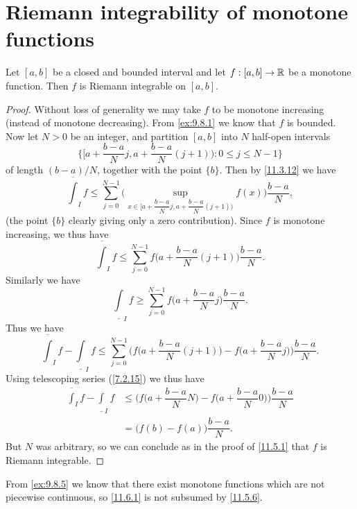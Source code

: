 \section{Riemann integrability of monotone functions}\label{sec:11.6}

\begin{prop}\label{11.6.1}
  Let \([a, b]\) be a closed and bounded interval and let \(f : [a, b] \to \mathbb{R}\) be a monotone function.
  Then \(f\) is Riemann integrable on \([a, b]\).
\end{prop}

\begin{proof}
  Without loss of generality we may take \(f\) to be monotone increasing (instead of monotone decreasing).
  From \cref{ex:9.8.1} we know that \(f\) is bounded.
  Now let \(N > 0\) be an integer, and partition \([a, b]\) into \(N\) half-open intervals
  \[
    \bigg\{\big[a + \dfrac{b - a}{N} j, a + \dfrac{b - a}{N} (j + 1)\big) : 0 \leq j \leq N - 1\bigg\}
  \]
  of length \((b - a) / N\), together with the point \(\{b\}\).
  Then by \cref{11.3.12} we have
  \[
    \overline{\int}_I f \leq \sum_{j = 0}^{N - 1} \Bigg(\sup_{x \in \big[a + \dfrac{b - a}{N} j, a + \dfrac{b - a}{N} (j + 1)\big)} f(x)\Bigg) \dfrac{b - a}{N},
  \]
  (the point \(\{b\}\) clearly giving only a zero contribution).
  Since \(f\) is monotone increasing, we thus have
  \[
    \overline{\int}_I f \leq \sum_{j = 0}^{N - 1} f\bigg(a + \dfrac{b - a}{N} (j + 1)\bigg) \dfrac{b - a}{N}.
  \]
  Similarly we have
  \[
    \underline{\int}_I f \geq \sum_{j = 0}^{N - 1} f\bigg(a + \dfrac{b - a}{N} j\bigg) \dfrac{b - a}{N}.
  \]
  Thus we have
  \[
    \overline{\int}_I f - \underline{\int}_I f \leq \sum_{j = 0}^{N - 1} \Bigg(f\bigg(a + \dfrac{b - a}{N} (j + 1)\bigg) - f\bigg(a + \dfrac{b - a}{N} j\bigg)\Bigg) \dfrac{b - a}{N}.
  \]
  Using telescoping series (\cref{7.2.15}) we thus have
  \begin{align*}
    \overline{\int}_I f - \underline{\int}_I f & \leq \Bigg(f\bigg(a + \dfrac{b - a}{N} N\bigg) - f\bigg(a + \dfrac{b - a}{N} 0\bigg)\Bigg) \dfrac{b - a}{N} \\
                                               & = \big(f(b) - f(a)\big) \dfrac{b - a}{N}.
  \end{align*}
  But \(N\) was arbitrary, so we can conclude as in the proof of \cref{11.5.1} that \(f\) is Riemann integrable.
\end{proof}

\begin{rmk}\label{11.6.2}
  From \cref{ex:9.8.5} we know that there exist monotone functions which are not piecewise continuous, so \cref{11.6.1} is not subsumed by \cref{11.5.6}.
\end{rmk}

